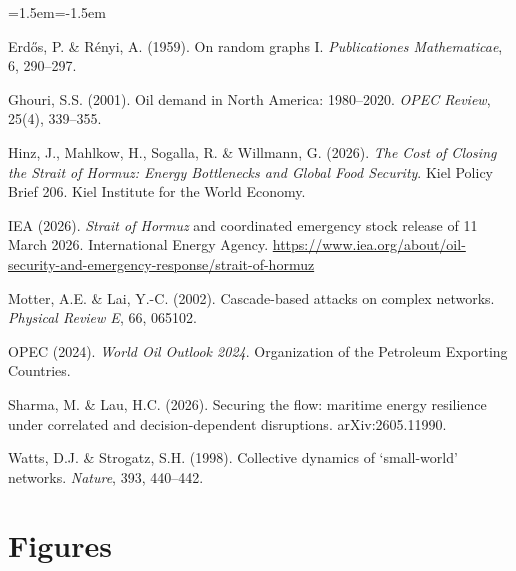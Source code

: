 \documentclass[11pt,a4paper]{article}
\begin{document}
\begin{list}{}{\leftmargin=1.5em\itemindent=-1.5em\itemsep=1pt\parsep=0pt}
\item Erdős, P. \& Rényi, A. (1959). On random graphs I. \emph{Publicationes Mathematicae}, 6, 290--297.

\item Ghouri, S.S. (2001). Oil demand in North America: 1980--2020. \emph{OPEC Review}, 25(4), 339--355.

\item Hinz, J., Mahlkow, H., Sogalla, R. \& Willmann, G. (2026). \emph{The Cost of Closing the Strait of Hormuz: Energy Bottlenecks and Global Food Security}. Kiel Policy Brief 206. Kiel Institute for the World Economy.

\item IEA (2026). \emph{Strait of Hormuz} and coordinated emergency stock release of 11 March 2026. International Energy Agency. \url{https://www.iea.org/about/oil-security-and-emergency-response/strait-of-hormuz}


\item Motter, A.E. \& Lai, Y.-C. (2002). Cascade-based attacks on complex networks. \emph{Physical Review E}, 66, 065102.

\item OPEC (2024). \emph{World Oil Outlook 2024}. Organization of the Petroleum Exporting Countries.

\item Sharma, M. \& Lau, H.C. (2026). Securing the flow: maritime energy resilience under correlated and decision-dependent disruptions. arXiv:2605.11990.


\item Watts, D.J. \& Strogatz, S.H. (1998). Collective dynamics of `small-world' networks. \emph{Nature}, 393, 440--442.

\end{list}


\clearpage
\section*{Figures}
\end{document}
